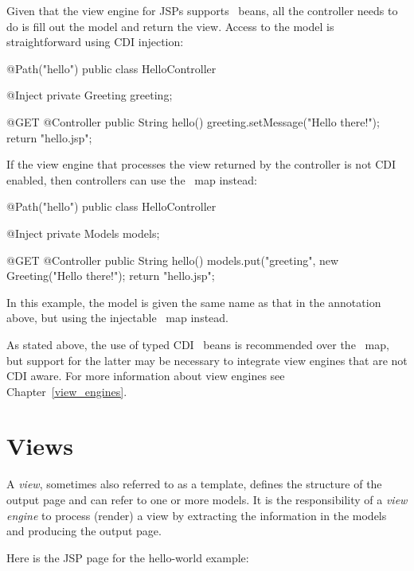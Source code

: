 Given that the view engine for JSPs supports \Named\ beans, all the controller
needs to do is fill out the model and return the view. Access to the model
is straightforward using CDI injection:

\begin{listing}{1}
@Path("hello")
public class HelloController {

	@Inject
	private Greeting greeting;

    @GET
    @Controller
    public String hello() {
        greeting.setMessage("Hello there!");
        return "hello.jsp";
    }
}
\end{listing}

If the view engine that processes the view returned by the controller is not CDI 
enabled, then controllers can use the \Models\ map instead:

\begin{listing}{1}
@Path("hello")
public class HelloController {

	@Inject
	private Models models;

    @GET
    @Controller
    public String hello() {
        models.put("greeting", new Greeting("Hello there!");
        return "hello.jsp";
    }
}
\end{listing}

In this example, the model is given the same name as that in the 
annotation above, but using the injectable \Models\ map instead.

As stated above, the use of typed CDI \Named\ beans is recommended over the \Models\ map,
but support for the latter may be necessary to integrate view engines that are not
CDI aware. For more information about view engines see Chapter~\ref{view_engines}.

\section{Views}
\label{views}

A {\em view}, sometimes also referred to as a template, defines the structure of the output
page and can refer to one or more models. It is the responsibility of a {\em view engine}
to process (render) a view by extracting the information in the models and producing the
output page. 

Here is the JSP page for the hello-world example:


